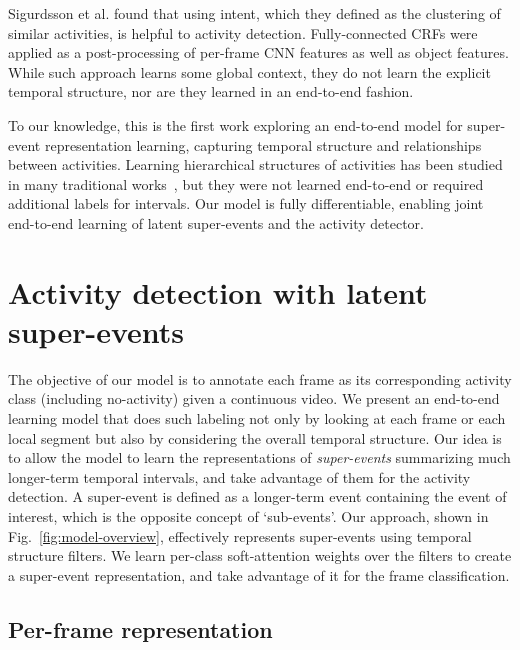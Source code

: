 \documentclass[10pt,twocolumn,letterpaper]{article}
\begin{document}
Sigurdsson et al. \cite{sigurdsson2017actions} found that using intent, which they defined as the clustering of similar activities, is helpful to activity detection. Fully-connected CRFs were applied as a post-processing of per-frame CNN features as well as object features. While such approach learns some global context, they do not learn the explicit temporal structure, nor are they learned in an end-to-end fashion.

To our knowledge, this is the first work exploring an end-to-end model for super-event representation learning, capturing temporal structure and relationships between activities. Learning hierarchical structures of activities has been studied in many traditional works~\cite{niebles2010modeling,gaidon2011actom,laxton2007leveraging,gupta2009understanding,brendel2011learning,ryoo13}, but they were not learned end-to-end or required additional labels for intervals. Our model is fully differentiable, enabling joint end-to-end learning of latent super-events and the activity detector.



\section{Activity detection with latent super-events}

The objective of our model is to annotate each frame as its corresponding activity class (including no-activity) given a continuous video. We present an end-to-end learning model that does such labeling not only by looking at each frame or each local segment but also by considering the overall temporal structure. Our idea is to allow the model to learn the representations of \emph{super-events} summarizing much longer-term temporal intervals, and take advantage of them for the activity detection. A super-event is defined as a longer-term event containing the event of interest, which is the opposite concept of `sub-events'. Our approach, shown in Fig.~\ref{fig:model-overview}, effectively represents super-events using temporal structure filters. We learn per-class soft-attention weights over the filters to create a super-event representation, and take advantage of it for the frame classification.





\subsection{Per-frame representation}
\label{subsec:per-frame}
\end{document}
